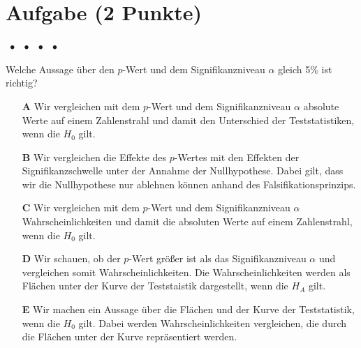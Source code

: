 \documentclass[a4paper, 9pt]{scrartcl}\usepackage[]{graphicx}\usepackage[]{xcolor}
\begin{document}

\section{Aufgabe \hfill (2 Punkte)}

\ifcollection
\begin{flushright}
\tiny\vspace{-2Ex}
\textbf{\examinhaltstart}
\exammodulemathstat $\;\bullet$
\exammodulestat $\;\bullet$
\exammodulestatbbv $\;\bullet$
\exammodulestatversuch $\;\bullet$
\exammodulebiostat
\vspace{-1Ex}
\end{flushright}
\fi




Welche Aussage über den $p$-Wert und dem Signifikanzniveau $\alpha$ gleich 5\% ist richtig?



\begin{enumerate}
\item [\textbf{A} \msquare] Wir vergleichen mit dem $p$-Wert und dem Signifikanzniveau $\alpha$ absolute Werte auf einem Zahlenstrahl und damit den Unterschied der Teststatistiken, wenn die $H_0$ gilt.
\item [\textbf{B} \msquare] Wir vergleichen die Effekte des $p$-Wertes mit den Effekten der Signifikanzschwelle unter der Annahme der Nullhypothese. Dabei gilt, dass wir die Nullhypothese nur ablehnen können anhand des Falsifikationsprinzips.
\item [\textbf{C} \msquare] Wir vergleichen mit dem $p$-Wert und dem Signifikanzniveau $\alpha$ Wahrscheinlichkeiten und damit die absoluten Werte auf einem Zahlenstrahl, wenn die $H_0$ gilt.
\item [\textbf{D} \msquare] Wir schauen, ob der $p$-Wert größer ist als das Signifikanzniveau $\alpha$ und vergleichen somit Wahrscheinlichkeiten. Die Wahrscheinlichkeiten werden als Flächen unter der Kurve der Teststaistik dargestellt, wenn die $H_A$ gilt.
\item [\textbf{E} \msquare] Wir machen ein Aussage über die Flächen und der Kurve der Teststatistik, wenn die $H_0$ gilt. Dabei werden Wahrscheinlichkeiten vergleichen, die durch die Flächen unter der Kurve repräsentiert werden.
\end{enumerate}
\end{document}
